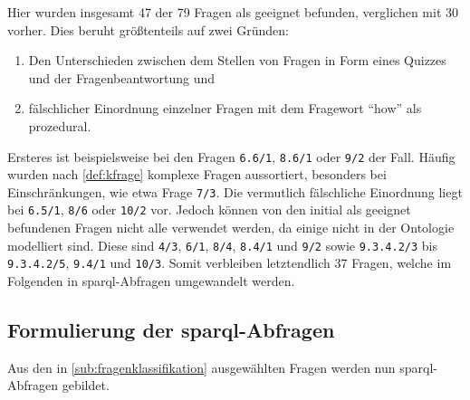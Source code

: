 Hier wurden insgesamt 47 der 79 Fragen als geeignet befunden, verglichen mit 30 vorher.
Dies beruht größtenteils auf zwei Gründen:
\begin{enumerate}
  \item Den Unterschieden zwischen dem Stellen von Fragen in Form eines Quizzes und der Fragenbeantwortung und
  \item fälschlicher Einordnung einzelner Fragen mit dem Fragewort \enquote{how} als prozedural.
\end{enumerate}
Ersteres ist beispielsweise bei den Fragen \texttt{6.6/1}, \texttt{8.6/1} oder \texttt{9/2} der Fall.
Häufig wurden nach \cref{def:kfrage} komplexe Fragen aussortiert, besonders bei Einschränkungen, wie etwa Frage \texttt{7/3}.
Die vermutlich fälschliche Einordnung liegt bei \texttt{6.5/1}, \texttt{8/6} oder \texttt{10/2} vor.
Jedoch können von den initial als geeignet befundenen Fragen nicht alle verwendet werden, da einige nicht in der Ontologie modelliert sind.
Diese sind \texttt{4/3}, \texttt{6/1}, \texttt{8/4}, \texttt{8.4/1} und \texttt{9/2} sowie \texttt{9.3.4.2/3} bis \texttt{9.3.4.2/5}, \texttt{9.4/1} und \texttt{10/3}.
Somit verbleiben letztendlich 37 Fragen, welche im Folgenden in \ac{sparql}-Abfragen umgewandelt werden.

\subsection[Formulierung der SPARQL-Abfragen]{Formulierung der \ac{sparql}-Abfragen}

Aus den in \cref{sub:fragenklassifikation} ausgewählten Fragen werden nun \ac{sparql}-Abfragen gebildet.

